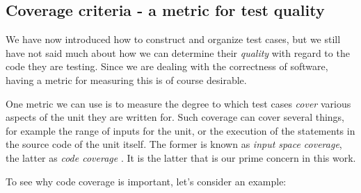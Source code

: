 \documentclass{article}
\newcommand{\tmem}[1]{{\em #1\/}}
\begin{document}
\subsection{Coverage criteria - a metric for test quality}

We have now introduced how to construct and organize test cases, but we still
have not said much about how we can determine their {\tmem{quality}} with
regard to the code they are testing. Since we are dealing with the correctness
of software, having a metric for measuring this is of course desirable.



One metric we can use is to measure the degree to which test cases
{\tmem{cover}} various aspects of the unit they are written for. Such coverage
can cover several things, for example the range of inputs for the unit, or the
execution of the statements in the source code of the unit itself. The former
is known as {\tmem{input space coverage}}, the latter as {\tmem{code
coverage}} {\cite{ammann2008introduction}}. It is the latter that is our prime
concern in this work.



To see why code coverage is important, let's consider an example:
\end{document}
